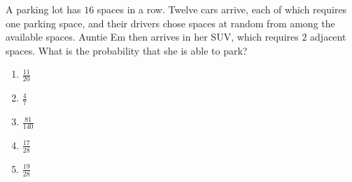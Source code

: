 A parking lot has $16$ spaces in a row. Twelve cars arrive, each of which requires one parking space, and their drivers chose spaces at random from among the available spaces. Auntie Em then arrives in her SUV, which requires $2$ adjacent spaces. What is the probability that she is able to park?
\begin{enumerate}
\item $\frac{11}{20}$
\item $\frac{4}{7}$
\item $\frac{81}{140}$
\item $\frac{17}{28}$
\item $\frac{19}{28}$
\end{enumerate}
